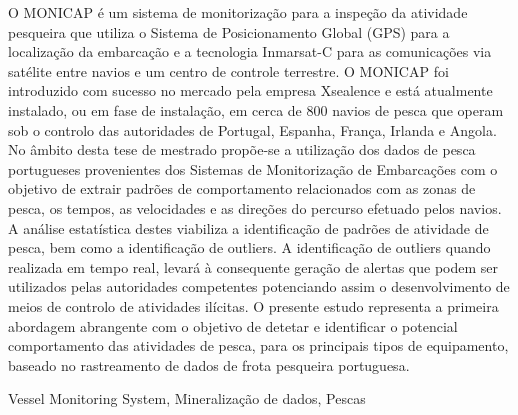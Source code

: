 \abstractPT  %

O MONICAP é um sistema de monitorização para a inspeção da atividade pesqueira que utiliza o Sistema de Posicionamento Global (GPS) para a localização da embarcação e a tecnologia Inmarsat-C para as comunicações via satélite entre navios e um centro de controle terrestre. O MONICAP foi introduzido com sucesso no mercado pela empresa Xsealence e está atualmente instalado, ou em fase de instalação, em cerca de 800 navios de pesca que operam sob o controlo das autoridades de Portugal, Espanha, França, Irlanda e Angola. No âmbito desta tese de mestrado propõe-se a utilização dos dados de pesca portugueses provenientes dos Sistemas de Monitorização de Embarcações com o objetivo de extrair padrões de comportamento relacionados com as zonas de pesca, os tempos, as velocidades e as direções do percurso efetuado pelos navios. A análise estatística destes viabiliza a identificação de padrões de atividade de pesca, bem como a identificação de outliers. A identificação de outliers quando realizada em tempo real, levará à consequente geração de alertas que podem ser utilizados pelas autoridades competentes potenciando assim o desenvolvimento de meios de controlo de atividades ilícitas. O presente estudo representa a primeira abordagem abrangente com o objetivo de detetar e identificar o potencial comportamento das atividades de pesca, para os principais tipos de equipamento, baseado no rastreamento de dados de frota pesqueira portuguesa.


\begin{keywords}
Vessel Monitoring System, Mineralização de dados, Pescas
\end{keywords}
